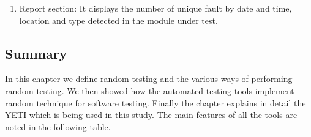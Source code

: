 \begin{enumerate}
\item Report section: It displays the number of unique fault by date and time, location and type detected in the module under test. 
\end{enumerate}


\subsection{Summary}
In this chapter we define random testing and the various ways of performing random testing. We then showed how the automated testing tools implement random technique for software testing. Finally the chapter explains in detail the YETI which is being used in this study. The main features of all the tools are noted in the following table.

